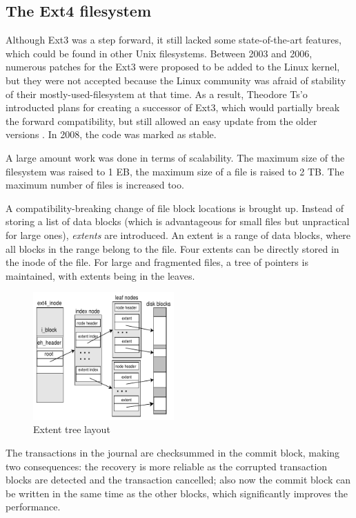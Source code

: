 \documentclass{acm_proc_article-sp}
\begin{document}
\subsection{The Ext4 filesystem}

Although Ext3 was a step forward, it still lacked some state-of-the-art features, which could be found in other Unix filesystems. Between 2003 and 2006, numerous patches for the Ext3 were proposed to be added to the Linux kernel, but they were not accepted because the Linux community was afraid of stability of their mostly-used-filesystem at that time. As a result, Theodore Ts'o introducted plans for creating a successor of Ext3, which would partially break the forward compatibility, but still allowed an easy update from the older versions \cite{newext4}. In 2008, the code was marked as stable.

A large amount work was done in terms of scalability. The maximum size of the filesystem was raised to 1 EB, the maximum size of a file is raised to 2 TB. The maximum number of files is increased too.

A compatibility-breaking change of file block locations is brought up. Instead of storing a list of data blocks (which is advantageous for small files but unpractical for large ones), {\it extents} are introduced. An extent is a range of data blocks, where all blocks in the range belong to the file. Four extents can be directly stored in the inode of the file. For large and fragmented files, a tree of pointers is maintained, with extents being in the leaves.

\begin{figure}
\centering
\includegraphics[width=0.48\textwidth]{images/extents.pdf}
	\caption{Extent tree layout \cite{newext4}}
\end{figure}

The transactions in the journal are checksummed in the commit block, making two consequences: the recovery is more reliable as the corrupted transaction blocks are detected and the transaction cancelled; also now the commit block can be written in the same time as the other blocks, which significantly improves the performance.
\end{document}

